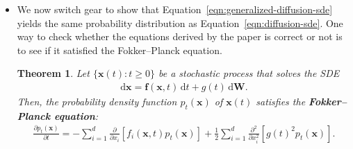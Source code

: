 \documentclass[10pt]{article}
\newtheorem{theorem}[lemma]{Theorem}
\newcommand{\dee}{\mathrm{d}}
\newcommand{\ve}[1]{\mathbf{#1}}
\begin{document}
\begin{itemize}
  \item We now switch gear to show that Equation~\eqref{eqn:generalized-diffusion-sde} yields the same probability distribution as Equation~\eqref{eqn:diffusion-sde}. One way to check whether the equations derived by the paper is correct or not is to see if it satisfied the Fokker--Planck equation.
  
  \begin{theorem}
    Let $\{ \ve{x}(t) : t \geq 0 \}$ be a stochastic process that solves the SDE
    \begin{align}
      \dee\ve{x} = \ve{f}(\ve{x}, t)\, \dee t + g(t)\, \dee\ve{W}. \label{eqn:diffusion-sde}
    \end{align}
    Then, the probability density function $p_t(\ve{x})$ of $\ve{x}(t)$ satisfies the {\bf Fokker--Planck equation}:
    \begin{align} \label{eqn:fokker-planck}
      \frac{\partial p_t(\ve{x})}{\partial t}
      = - \sum_{i=1}^d \frac{\partial}{\partial x_i}[f_i(\ve{x},t) p_t(\ve{x})] + \frac{1}{2} \sum_{i=1}^d \frac{\partial^2}{\partial x_i^2} [g(t)^2 p_t(\ve{x})].
    \end{align}
  \end{theorem}


\end{itemize}
\end{document}
